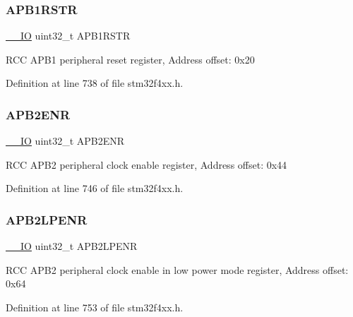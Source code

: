 \subsubsection{\texorpdfstring{A\+P\+B1\+R\+S\+TR}{APB1RSTR}}
{\footnotesize\ttfamily \hyperlink{group___c_m_s_i_s__core__definitions_gaec43007d9998a0a0e01faede4133d6be}{\+\_\+\+\_\+\+IO} uint32\+\_\+t A\+P\+B1\+R\+S\+TR}

R\+CC A\+P\+B1 peripheral reset register, Address offset\+: 0x20 

Definition at line 738 of file stm32f4xx.\+h.

\mbox{\label{struct_r_c_c___type_def_acc7bb47dddd2d94de124f74886d919be}} 
\subsubsection{\texorpdfstring{A\+P\+B2\+E\+NR}{APB2ENR}}
{\footnotesize\ttfamily \hyperlink{group___c_m_s_i_s__core__definitions_gaec43007d9998a0a0e01faede4133d6be}{\+\_\+\+\_\+\+IO} uint32\+\_\+t A\+P\+B2\+E\+NR}

R\+CC A\+P\+B2 peripheral clock enable register, Address offset\+: 0x44 

Definition at line 746 of file stm32f4xx.\+h.

\mbox{\label{struct_r_c_c___type_def_aba51c57f9506e14a6f5983526c78943b}} 
\subsubsection{\texorpdfstring{A\+P\+B2\+L\+P\+E\+NR}{APB2LPENR}}
{\footnotesize\ttfamily \hyperlink{group___c_m_s_i_s__core__definitions_gaec43007d9998a0a0e01faede4133d6be}{\+\_\+\+\_\+\+IO} uint32\+\_\+t A\+P\+B2\+L\+P\+E\+NR}

R\+CC A\+P\+B2 peripheral clock enable in low power mode register, Address offset\+: 0x64 

Definition at line 753 of file stm32f4xx.\+h.

\mbox{\label{struct_r_c_c___type_def_ab2c5389c9ff4ac188cd498b8f7170968}} 
